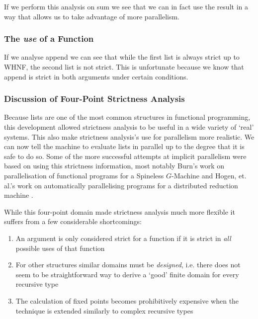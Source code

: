 If we perform this analysis on \<sum\> we see that we can in fact use the
result in a way that allows us to take advantage of more parallelism.

\subsubsection{The \emph{use} of a Function}

If we analyse \<append\> we can see that while the first list is always
strict up to WHNF, the second list is not strict. This is unfortunate because
we know that \<append\> is strict in both arguments under certain conditions.

\subsubsection{Discussion of Four-Point Strictness Analysis}

Because lists are one of the most common structures in functional programming,
this development allowed strictness analysis to be useful in a wide variety of
`real' systems. This also make strictness analysis's use for parallelism more
realistic. We can now tell the machine to evaluate lists in parallel up to the
degree that it is safe to do so. Some of the more successful attempts at
implicit parallelism were based on using this strictness information, most
notably Burn's work on parallelisation of functional programs for a Spineless
$G$-Machine  and Hogen, et. al.'s work on automatically
parallelising programs for a distributed reduction machine
\citep{hogen1992automatic}.

While this four-point domain made strictness analysis much more flexible it
suffers from a few considerable shortcomings:

\begin{enumerate}
    \item An argument is only considered strict for a function if it is strict
        in \emph{all} possible uses of that function
    \item For other structures similar domains must be \emph{designed}, i.e.
        there does not seem to be straightforward way to derive a `good' finite
        domain for every recursive type
    \item The calculation of fixed points becomes prohibitively expensive when
        the technique is extended similarly to complex recursive types
\end{enumerate}

